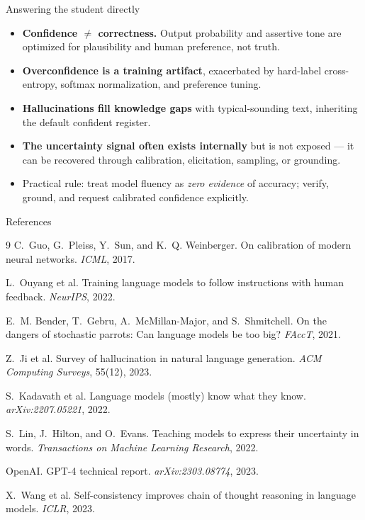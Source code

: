 \documentclass[aspectratio=169,11pt]{beamer}
\begin{document}
\begin{frame}{Answering the student directly}
  \begin{itemize}
    \item \textbf{Confidence $\neq$ correctness.} Output probability and assertive tone are optimized for plausibility and human preference, not truth.
    \item \textbf{Overconfidence is a training artifact}, exacerbated by hard-label cross-entropy, softmax normalization, and preference tuning.
    \item \textbf{Hallucinations fill knowledge gaps} with typical-sounding text, inheriting the default confident register.
    \item \textbf{The uncertainty signal often exists internally} but is not exposed --- it can be recovered through calibration, elicitation, sampling, or grounding.
    \item Practical rule: treat model fluency as \emph{zero evidence} of accuracy; verify, ground, and request calibrated confidence explicitly.
  \end{itemize}
\end{frame}

\begin{frame}[allowframebreaks]{References}
  \small
  \begin{thebibliography}{9}
    C.~Guo, G.~Pleiss, Y.~Sun, and K.~Q. Weinberger.
    \newblock On calibration of modern neural networks.
    \newblock \emph{ICML}, 2017.

    L.~Ouyang et al.
    \newblock Training language models to follow instructions with human feedback.
    \newblock \emph{NeurIPS}, 2022.

    E.~M. Bender, T.~Gebru, A.~McMillan-Major, and S.~Shmitchell.
    \newblock On the dangers of stochastic parrots: Can language models be too big?
    \newblock \emph{FAccT}, 2021.

    Z.~Ji et al.
    \newblock Survey of hallucination in natural language generation.
    \newblock \emph{ACM Computing Surveys}, 55(12), 2023.

    S.~Kadavath et al.
    \newblock Language models (mostly) know what they know.
    \newblock \emph{arXiv:2207.05221}, 2022.

    S.~Lin, J.~Hilton, and O.~Evans.
    \newblock Teaching models to express their uncertainty in words.
    \newblock \emph{Transactions on Machine Learning Research}, 2022.

    OpenAI.
    \newblock GPT-4 technical report.
    \newblock \emph{arXiv:2303.08774}, 2023.

    X.~Wang et al.
    \newblock Self-consistency improves chain of thought reasoning in language models.
    \newblock \emph{ICLR}, 2023.
  \end{thebibliography}
\end{frame}
\end{document}

